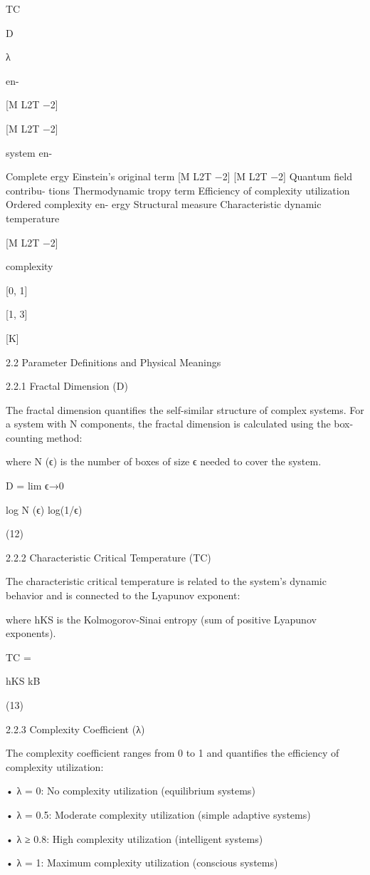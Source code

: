 TC

D

λ

en-

[M L2T −2]

[M L2T −2]

system en-

Complete
ergy
Einstein’s original term [M L2T −2]
[M L2T −2]
Quantum field contribu-
tions
Thermodynamic
tropy term
Efficiency of complexity
utilization
Ordered complexity en-
ergy
Structural
measure
Characteristic dynamic
temperature

[M L2T −2]

complexity

[0, 1]

[1, 3]

[K]

2.2 Parameter Definitions and Physical Meanings

2.2.1 Fractal Dimension (D)

The fractal dimension quantifies the self-similar structure of complex systems. For a
system with N components, the fractal dimension is calculated using the box-counting
method:

where N (ϵ) is the number of boxes of size ϵ needed to cover the system.

D = lim
ϵ→0

log N (ϵ)
log(1/ϵ)

(12)

2.2.2 Characteristic Critical Temperature (TC)

The characteristic critical temperature is related to the system’s dynamic behavior and
is connected to the Lyapunov exponent:

where hKS is the Kolmogorov-Sinai entropy (sum of positive Lyapunov exponents).

TC =

hKS
kB

(13)

2.2.3 Complexity Coefficient (λ)

The complexity coefficient ranges from 0 to 1 and quantifies the efficiency of complexity
utilization:

• λ = 0: No complexity utilization (equilibrium systems)

• λ = 0.5: Moderate complexity utilization (simple adaptive systems)

• λ ≥ 0.8: High complexity utilization (intelligent systems)

• λ = 1: Maximum complexity utilization (conscious systems)

